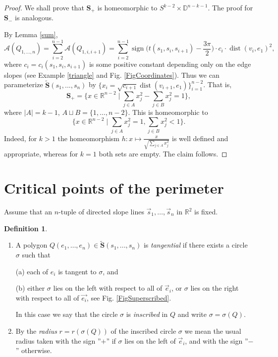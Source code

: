 \documentclass[12pt]{amsart}
\theoremstyle{plain}
\theoremstyle{definition}
\newtheorem{definition}{Definition}
\theoremstyle{remark}
\theoremstyle{plain}
\theoremstyle{definition}
\def\R{\mathbb{R}}
\def\D{\mathbb{D}}
\DeclareMathOperator\sign{sign}
\DeclareMathOperator\dist{dist}
\begin{document}
\begin{proof}
We shall prove that \(\mathbf{S}_+\) is homeomorphic to \(S^{k-2} \times \D^{n-k-1}\). The proof  for \(\mathbf{S}_-\) is analogous.


By Lemma \ref{sum},
\[
\mathcal{A}(Q_{1,\ldots,n})=\sum_{i=2}^{n-1}\mathcal{A}(Q_{1,i,i+1})=\sum_{i=2}^{n-1}\sign\Big(t(s_1,s_i,s_{i+1})-\frac{3\pi}2\Big)\cdot c_i\cdot \dist(v_i,e_1)^2,
\]
where \(c_i=c_i(s_1,s_i,s_{i+1})\) is some positive constant depending only on the edge slopes (see Example \ref{triangle} and Fig. \ref{FigCoordinates}).  Thus we can parameterize $\widetilde{\mathbf{S}}(s_1,...,s_n)$ by \(\{x_i=\sqrt{c_{i+1}}\dist(v_{i+1},e_1)\}_{i=1}^{n-2}\). That is,
\[\mathbf{S}_+=\{x\in\R^{n-2} \mid \sum_{j\in A}x_j^2 - \sum_{j\in B} x_j^2 =1\},\] where
\(|A|=k-1\), \(A\sqcup B=\{1,\ldots,n-2\}\).
This is homeomorphic to \[\{x\in\R^{n-2} \mid \sum_{j\in A}x_j^2 =1, \sum_{j\in B}x_j^2 <1\}.\]
Indeed, for \(k>1\) the homeomorphism \(h: x\mapsto \frac{x}{\sqrt{\sum_{j\in A}x_j^2}}\) is well defined and appropriate, whereas for \(k=1\) both sets are empty.
The claim follows.
\end{proof}


\section{Critical points of the perimeter }
Assume that an $n$-tuple of directed slope lines  \(\vec{s}_1,\ldots,\vec{s}_n\) in \(\R^2\) is fixed.


\begin{definition}\label{DefTang} \begin{enumerate}
                                 \item A polygon \(Q(e_1,\ldots,e_n)\in \widetilde{\mathbf{S}}(s_1,...,s_n)\)  is \textit{tangential} if there exists a circle  $\sigma$ such that

                                      (a)  each of $e_i$  is tangent to $\sigma$, and


(b) either $\sigma$ lies on the left with respect to all of $\vec{e}_i$, or $\sigma$ lies on the right with respect to all of $\vec{e_i }$, see Fig. \ref{FigSuperscribed}.

In this case we say that the circle $\sigma$ is \textit{inscribed} in $Q$  and write $\sigma=\sigma(Q)$.
                                 \item By the \textit{radius} $r=r(\sigma(Q))$  of the inscribed circle $\sigma$ we mean the usual radius taken with the  sign  ''$+$'' if $\sigma$ lies on the left of $\vec{e}_i$, and with the sign ''$-$'' otherwise.
                               \end{enumerate}



\end{definition}
\end{document}
